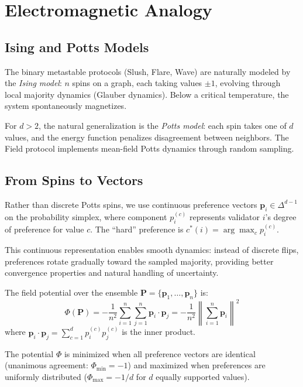 \section{Electromagnetic Analogy}

\label{sec:field-analogy}

\subsection{Ising and Potts Models}

The binary metastable protocols (Slush, Flare, Wave) are naturally modeled by the
\emph{Ising model}: $n$ spins on a graph, each taking values $\pm 1$, evolving through
local majority dynamics (Glauber dynamics). Below a critical temperature, the system
spontaneously magnetizes.

For $d > 2$, the natural generalization is the \emph{Potts model}: each spin takes
one of $d$ values, and the energy function penalizes disagreement between neighbors.
The Field protocol implements mean-field Potts dynamics through random sampling.

\subsection{From Spins to Vectors}

Rather than discrete Potts spins, we use continuous preference vectors
$\mathbf{p}_i \in \Delta^{d-1}$ on the probability simplex, where component $p_i^{(c)}$
represents validator $i$'s degree of preference for value $c$. The ``hard'' preference
is $c^*(i) = \arg\max_c p_i^{(c)}$.

This continuous representation enables smooth dynamics: instead of discrete flips,
preferences rotate gradually toward the sampled majority, providing better convergence
properties and natural handling of uncertainty.

\begin{definition}
\label{def:field-potential}
The field potential over the ensemble $\mathbf{P} = \{\mathbf{p}_1, \ldots, \mathbf{p}_n\}$ is:
\begin{equation}
\Phi(\mathbf{P}) = -\frac{1}{n^2} \sum_{i=1}^{n} \sum_{j=1}^{n} \mathbf{p}_i \cdot \mathbf{p}_j
= -\frac{1}{n^2} \left\| \sum_{i=1}^{n} \mathbf{p}_i \right\|^2
\label{eq:field-potential}
\end{equation}
where $\mathbf{p}_i \cdot \mathbf{p}_j = \sum_{c=1}^{d} p_i^{(c)} p_j^{(c)}$ is the inner product.
\end{definition}

The potential $\Phi$ is minimized when all preference vectors are identical (unanimous
agreement: $\Phi_{\min} = -1$) and maximized when preferences are uniformly distributed
($\Phi_{\max} = -1/d$ for $d$ equally supported values).

